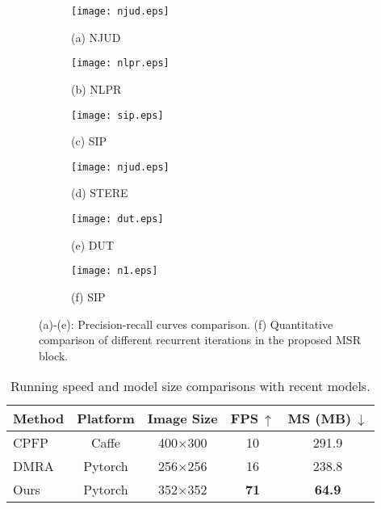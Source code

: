 \documentclass[runningheads]{llncs}
\begin{document}
\begin{figure}[t]
\captionsetup[subfigure]{labelformat=empty}	
	\centering
    \begin{subfigure}[t]{4.0cm}
		\centering
		\texttt{[image: njud.eps]}
		\caption{\scriptsize (a) NJUD~\cite{ju2014depth}}	
	\end{subfigure}
	\begin{subfigure}[t]{4.0cm}
		\centering
		\texttt{[image: nlpr.eps]}
		\caption{\scriptsize (b) NLPR~\cite{peng2014rgbd}}	
	\end{subfigure}
	\begin{subfigure}[t]{4.0cm}
		\centering
		\texttt{[image: sip.eps]}
		\caption{\scriptsize (c) SIP~\cite{fan2019rethinking}}
	\end{subfigure}

    \vspace{1pt}
    
    \begin{subfigure}[t]{4.0cm}
		\centering
		\texttt{[image: njud.eps]}
		\caption{\scriptsize (d) STERE~\cite{niu2012leveraging}}	
	\end{subfigure}
	\begin{subfigure}[t]{4.0cm}
		\centering
		\texttt{[image: dut.eps]}
		\caption{\scriptsize (e) DUT~\cite{piao2019depth}}	
	\end{subfigure}
	\begin{subfigure}[t]{4.0cm}
		\centering
		\texttt{[image: n1.eps]}
		\caption{\scriptsize (f) SIP~\cite{fan2019rethinking}}
	\end{subfigure}

    \caption{(a)-(e): Precision-recall curves comparison. (f) Quantitative comparison of different recurrent iterations in the proposed MSR block.}\label{fig_pr}
\end{figure}


\setlength{\tabcolsep}{6pt}
\begin{table}[]
\begin{center}
\caption{Running speed and model size comparisons with recent models.}
\label{table_time}
\begin{tabular}{lcccc}
\hline
\hline
Method & Platform & Image Size & FPS$~\uparrow$ & MS (MB)$~\downarrow$ \\ \hline
CPFP~\cite{zhao2019contrast}   & Caffe    & 400$\times$300     &  10   & 291.9       \\
DMRA~\cite{piao2019depth}   & Pytorch  & 256$\times$256     & 16  & 238.8     \\
Ours   & Pytorch  & 352$\times$352     & \textbf{71}  & \textbf{64.9}      \\ \hline
\hline
\end{tabular}
\end{center}
\end{table}
\setlength{\tabcolsep}{1.6pt}
\end{document}
